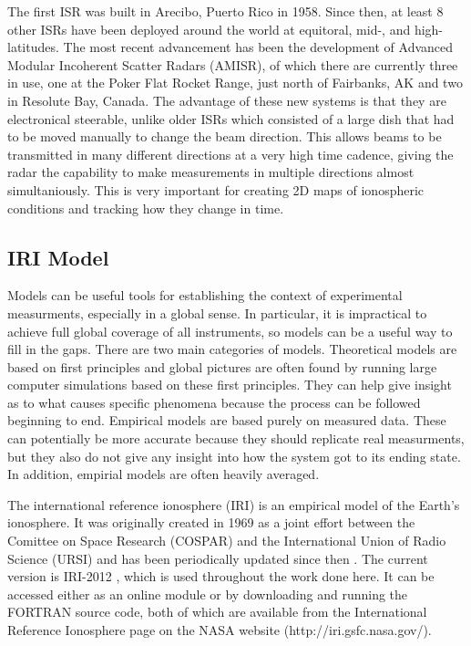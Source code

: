The first ISR was built in Arecibo, Puerto Rico in 1958.  Since then, at least 8 other ISRs have been deployed around the world at equitoral, mid-, and high-latitudes.  The most recent advancement has been the development of Advanced Modular Incoherent Scatter Radars (AMISR), of which there are currently three in use, one at the Poker Flat Rocket Range, just north of Fairbanks, AK and two in Resolute Bay, Canada.  The advantage of these new systems is that they are electronical steerable, unlike older ISRs which consisted of a large dish that had to be moved manually to change the beam direction.  This allows beams to be transmitted in many different directions at a very high time cadence, giving the radar the capability to make measurements in multiple directions almost simultaniously.  This is very important for creating 2D maps of ionospheric conditions and tracking how they change in time.

\subsection{IRI Model}
\label{sec:iri}
Models can be useful tools for establishing the context of experimental measurments, especially in a global sense.  In particular, it is impractical to achieve full global coverage of all instruments, so models can be a useful way to fill in the gaps.  There are two main categories of models.  Theoretical models are based on first principles and global pictures are often found by running large computer simulations based on these first principles.  They can help give insight as to what causes specific phenomena because the process can be followed beginning to end.  Empirical models are based purely on measured data.  These can potentially be more accurate because they should replicate real measurments, but they also do not give any insight into how the system got to its ending state.  In addition, empirial models are often heavily averaged.

The international reference ionosphere (IRI) is an empirical model of the Earth's ionosphere.  It was originally created in 1969 as a joint effort between the Comittee on Space Research (COSPAR) and the International Union of Radio Science (URSI) and has been periodically updated since then \citep{Rawer1978}.  The current version is IRI-2012 \citep{Bilitza2011}, which is used throughout the work done here.  It can be accessed either as an online module or by downloading and running the FORTRAN source code, both of which are available from the International Reference Ionosphere page on the NASA website (http://iri.gsfc.nasa.gov/).

